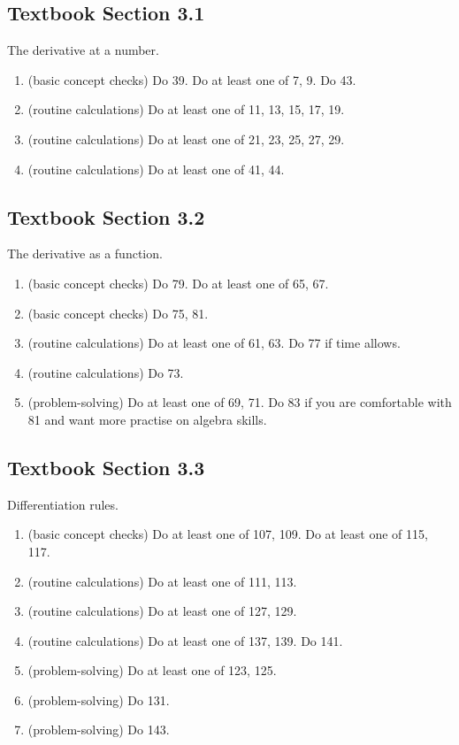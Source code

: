 \documentclass[../main.tex]{subfiles}
\begin{document}
\subsection*{Textbook Section 3.1}

The derivative at a number. 
\begin{enumerate}
  \item(basic concept checks) Do 39. Do at least one of 7, 9. Do 43.
  \item(routine calculations) Do at least one of 11, 13, 15, 17, 19.
  \item(routine calculations) Do at least one of 21, 23, 25, 27, 29.
  \item(routine calculations) Do at least one of 41, 44.
\end{enumerate}

\subsection*{Textbook Section 3.2}

The derivative as a function.
\begin{enumerate}
  \item (basic concept checks) Do 79. Do at least one of 65, 67. 
  \item (basic concept checks) Do 75, 81.
  \item (routine calculations) Do at least one of 61, 63. Do 77 if time allows.
  \item (routine calculations) Do 73.
  \item (problem-solving) Do at least one of 69, 71. Do 83 if you are comfortable with 81 and want more practise on algebra skills.
\end{enumerate}

\clearpage
\subsection*{Textbook Section 3.3}

Differentiation rules.
\begin{enumerate}
  \item (basic concept checks) Do at least one of 107, 109. Do at least one of 115, 117.
  \item (routine calculations) Do at least one of 111, 113. 
  \item (routine calculations) Do at least one of 127, 129.
  \item (routine calculations) Do at least one of 137, 139. Do 141.
  \item (problem-solving) Do at least one of 123, 125.
  \item (problem-solving) Do 131.
  \item (problem-solving) Do 143. 
\end{enumerate}
\end{document}
